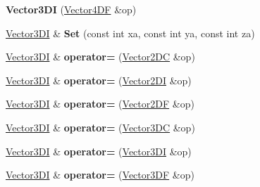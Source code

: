 \begin{DoxyCompactItemize}
\item 
\hypertarget{class_vector3_d_i_a4cbbc7decb8e562e75f4387be17b4cc4}{{\bfseries Vector3\+D\+I} (\hyperlink{class_vector4_d_f}{Vector4\+D\+F} \&op)}\label{class_vector3_d_i_a4cbbc7decb8e562e75f4387be17b4cc4}

\item 
\hypertarget{class_vector3_d_i_a61fd4ea7e4f70e323429acd94a0bcafe}{\hyperlink{class_vector3_d_i}{Vector3\+D\+I} \& {\bfseries Set} (const int xa, const int ya, const int za)}\label{class_vector3_d_i_a61fd4ea7e4f70e323429acd94a0bcafe}

\item 
\hypertarget{class_vector3_d_i_a73bb2ee0b9930146158024c13dff3369}{\hyperlink{class_vector3_d_i}{Vector3\+D\+I} \& {\bfseries operator=} (\hyperlink{class_vector2_d_c}{Vector2\+D\+C} \&op)}\label{class_vector3_d_i_a73bb2ee0b9930146158024c13dff3369}

\item 
\hypertarget{class_vector3_d_i_a74cfdfaea1624bf648e866cdd7bfc63d}{\hyperlink{class_vector3_d_i}{Vector3\+D\+I} \& {\bfseries operator=} (\hyperlink{class_vector2_d_i}{Vector2\+D\+I} \&op)}\label{class_vector3_d_i_a74cfdfaea1624bf648e866cdd7bfc63d}

\item 
\hypertarget{class_vector3_d_i_a1c0c32f38836ee1f94791a7e47fcaba1}{\hyperlink{class_vector3_d_i}{Vector3\+D\+I} \& {\bfseries operator=} (\hyperlink{class_vector2_d_f}{Vector2\+D\+F} \&op)}\label{class_vector3_d_i_a1c0c32f38836ee1f94791a7e47fcaba1}

\item 
\hypertarget{class_vector3_d_i_a62bc0537edfa452e781c8ea7623e25c3}{\hyperlink{class_vector3_d_i}{Vector3\+D\+I} \& {\bfseries operator=} (\hyperlink{class_vector3_d_c}{Vector3\+D\+C} \&op)}\label{class_vector3_d_i_a62bc0537edfa452e781c8ea7623e25c3}

\item 
\hypertarget{class_vector3_d_i_ad1935da998bb92face459cbb1474c755}{\hyperlink{class_vector3_d_i}{Vector3\+D\+I} \& {\bfseries operator=} (\hyperlink{class_vector3_d_i}{Vector3\+D\+I} \&op)}\label{class_vector3_d_i_ad1935da998bb92face459cbb1474c755}

\item 
\hypertarget{class_vector3_d_i_a5bc5c2be1725295ad583797f16e166ed}{\hyperlink{class_vector3_d_i}{Vector3\+D\+I} \& {\bfseries operator=} (\hyperlink{class_vector3_d_f}{Vector3\+D\+F} \&op)}\label{class_vector3_d_i_a5bc5c2be1725295ad583797f16e166ed}


\end{DoxyCompactItemize}
